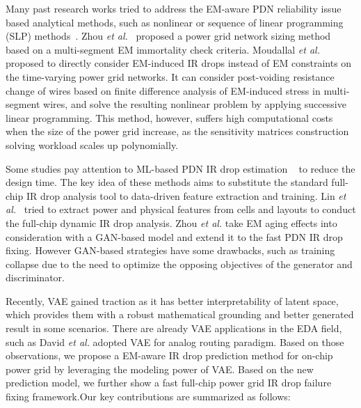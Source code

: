 Many past research works tried to address the EM-aware PDN reliability issue based analytical methods, such as nonlinear or sequence of linear programming (SLP) methods~\cite{ChBr:TCAD'88,DuMa:DAC'89,Tan:DAC'99,Wang:TCAD'05,ZhouSun:TVLSI'19, Sukharev:2019pg, ZhouYu:ASPDAC'20,ZhouJin:ICCAD'20}. Zhou {\it et al.}~\cite{ZhouSun:TVLSI'19,ZhouChen:Integration'21} proposed a power grid network sizing method based on a multi-segment EM immortality check criteria. Moudallal {\it et al.}~\cite{Sukharev:2019pg} proposed to directly consider EM-induced IR drops instead of EM constraints on the time-varying power grid networks. It can consider post-voiding resistance change of wires based on finite difference analysis of EM-induced stress in multi-segment wires, and solve the resulting nonlinear problem by applying successive linear programming. This method, however, suffers high computational costs when the size of the power grid increase, as the sensitivity matrices construction solving workload scales up polynomially.
   

Some studies pay attention to ML-based PDN IR drop estimation ~\cite{LinFang:2018vts,Fang:2018dynireco,HoKahng:ICCAD'19,Xie:2020powernet,Sachin:ASPDAC'21} to reduce the design time. 
The key idea of these methods aims to substitute the standard full-chip IR drop analysis tool to data-driven feature extraction and training. Lin {\it et al.}~\cite{LinFang:2018vts} tried to extract power and physical features from cells and layouts to conduct the full-chip dynamic IR drop analysis. Zhou {\it et al.} \cite{ZhouJin:ICCAD'20} take EM aging effects into consideration with a GAN-based model and extend it to the fast PDN IR drop fixing. However GAN-based strategies have some drawbacks, such as training collapse due to the need to optimize the opposing objectives of the generator and discriminator. 


Recently,  VAE  \cite{Diederik:arxiv'22} gained traction as it has better interpretability of latent space, which provides them with a robust mathematical grounding and better generated result in some scenarios. There are already VAE applications in the EDA field, such as David {\it et al.} \cite{ZhuICCAD19:GeniusRoute} adopted VAE for analog routing paradigm.
Based on those observations, we propose a EM-aware IR drop prediction method for on-chip power grid by leveraging the modeling power of VAE. Based on the new prediction model, we further show a fast full-chip power grid IR drop failure fixing framework.Our key contributions are summarized as follows:

